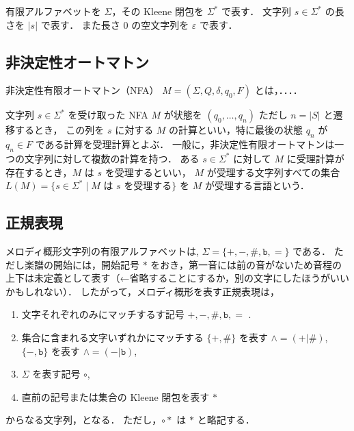\documentclass[11pt]{jreport}
\begin{document}
有限アルファベットを $\Sigma$，その Kleene 閉包を $\Sigma^*$ で表す．
文字列 $s\in \Sigma^*$ の長さを $|s|$ で表す．
また長さ $0$ の空文字列を $\varepsilon$ で表す．

\subsection*{非決定性オートマトン}

\begin{defn}
非決定性有限オートマトン（NFA） $M = (\Sigma, Q, \delta, q_0, F)$ とは，．．．．

\vspace{2cm}

文字列 $s \in \Sigma^*$ を受け取った NFA $M$ が状態を $(q_0, \ldots, q_n)$ ただし $n = |S|$ と遷移するとき，
この列を $s$ に対する $M$ の計算といい，特に最後の状態 $q_n$ が $q_n \in F$ である計算を受理計算とよぶ．
一般に，非決定性有限オートマトンは一つの文字列に対して複数の計算を持つ．
ある $s\in\Sigma^*$ に対して $M$ に受理計算が存在するとき，$M$ は $s$ を受理するといい，
$M$ が受理する文字列すべての集合 $L(M) = \{ s \in \Sigma^* \mid \mbox{$M$ は $s$ を受理する}\}$ を $M$ が受理する言語という．
\end{defn}

\subsection*{正規表現}

メロディ概形文字列の有限アルファベットは, $\Sigma = \{\mathtt{+}, \mathtt{-}, \mathtt{\#}, \mathtt{b}, \mathtt{=}\}$ である．
ただし楽譜の開始には，開始記号 $\mathtt{*}$ をおき，第一音には前の音がないため音程の上下は未定義として表す（←省略することにするか，別の文字にしたほうがいいかもしれない）．
したがって，メロディ概形を表す正規表現は，
\begin{enumerate}
\item 
文字それぞれのみにマッチするす記号
$\mathtt{+}, \mathtt{-}, \mathtt{\#}, \mathtt{b}, \mathtt{=}$ .
\item
集合に含まれる文字いずれかにマッチする $\{\mathtt{+}, \mathtt{\#}\}$ を表す $\mathtt{\wedge} = \mathtt{(+|\#)}$, $\{\mathtt{-}, \mathtt{b}\}$ を表す $\mathtt{\wedge} = \mathtt{(-|b)}$, 
\item
$\Sigma$ を表す記号 $\mathtt{\circ}$, 
\item
直前の記号または集合の Kleene 閉包を表す $\mathtt{*}$
\end{enumerate}
からなる文字列，となる．
ただし，$\mathtt{\circ*}$ は $\mathtt{*}$ と略記する．
\end{document}

